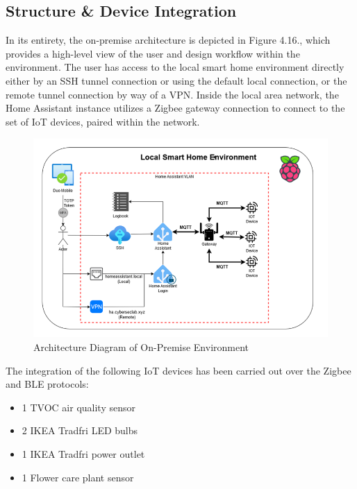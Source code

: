 \subsection{Structure \& Device Integration}
In its entirety, the on-premise architecture is depicted in Figure 4.16., which provides a high-level view of the user and design workflow within the environment. The user has access to the local smart home environment directly either by an SSH tunnel connection or using the default local connection, or the remote tunnel connection by way of a VPN. Inside the local area network, the Home Assistant instance utilizes a Zigbee gateway connection to connect to the set of IoT devices, paired within the network.
\begin{figure}[H]
	\centering
	\includegraphics[width=0.8 \linewidth]{Images/K4/Picture21.png}
	\caption{Architecture Diagram of On-Premise Environment}
	\label{fig:local_arch}
\end{figure}

The integration of the following IoT devices has been carried out over the Zigbee and BLE protocols:
\begin{itemize}
    \item 1 TVOC air quality sensor\cite{aqara_monitor}
    \item 2 IKEA Tradfri LED bulbs\cite{tradfri_led}
    \item 1 IKEA Tradfri power outlet\cite{tradfri_outlet}
    \item 1 Flower care plant sensor\cite{flower_care_sensor}
\end{itemize}

